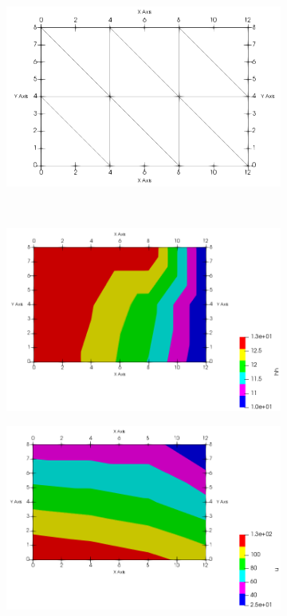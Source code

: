 \documentclass{article} %
\begin{document}
\begin{figure}[H]
	\centering
	\begin{subfigure}[b]{0.41\textwidth}
		\includegraphics[width=\textwidth]{option1_a}
		\caption{}
		\label{}
	\end{subfigure}\\
	\begin{subfigure}[b]{0.49\textwidth}
		\includegraphics[width=\textwidth]{option1_ahh}
		\caption{}
		\label{}
	\end{subfigure}
	\begin{subfigure}[b]{0.49\textwidth}
		\includegraphics[width=\textwidth]{option1_au}

\end{subfigure}
\end{figure}
\end{document}
